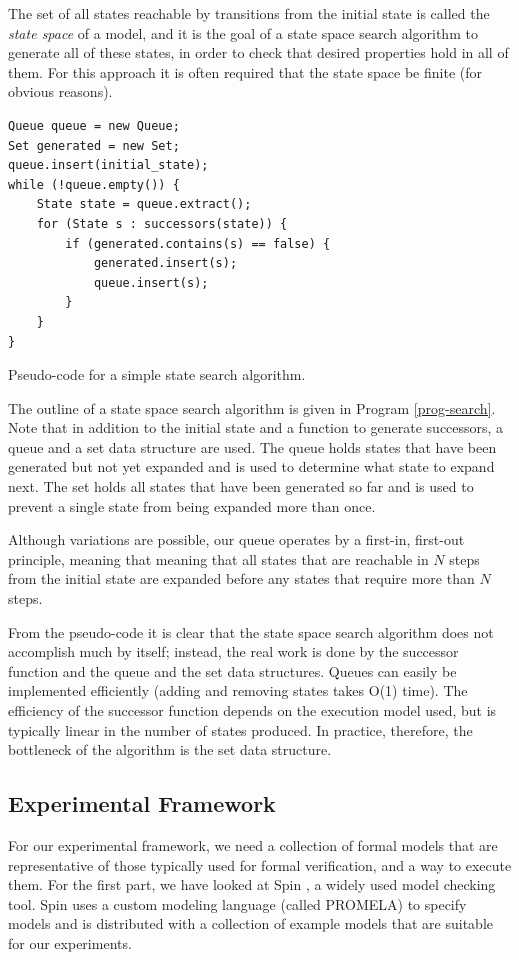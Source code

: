 \documentclass{acm_proc_article-sp}
\begin{document}
The set of all states reachable by transitions from the initial state is called
the \emph{state space} of a model, and it is the goal of a state space search
algorithm to generate all of these states, in order to check that desired
properties hold in all of them. For this approach it is often required that
the state space be finite (for obvious reasons).

\begin{program}
\begin{verbatim}
Queue queue = new Queue;
Set generated = new Set;
queue.insert(initial_state);
while (!queue.empty()) {
    State state = queue.extract();
    for (State s : successors(state)) {
        if (generated.contains(s) == false) {
            generated.insert(s);
            queue.insert(s);
        }
    }
}
\end{verbatim}
\caption{Pseudo-code for a simple state search algorithm.}
\label{prog-search}
\end{program}

The outline of a state space search algorithm is given in Program
\ref{prog-search}. Note that in addition to the initial state and a function
to generate successors, a queue and a set data structure are used. The queue
holds states that have been generated but not yet expanded and is used to
determine what state to expand next. The set holds all states that have been
generated so far and is used to prevent a single state from being expanded
more than once.

Although variations are possible, our queue operates by a first-in, first-out
principle, meaning that meaning that all states that are reachable in $N$ steps
from the initial state are expanded before any states that require more than
$N$ steps.

From the pseudo-code it is clear that the state space search algorithm does not
accomplish much by itself; instead, the real work is done by the successor
function and the queue and the set data structures. Queues can easily be
implemented efficiently (adding and removing states takes O(1) time).
The efficiency of the successor function depends on the execution model used,
but is typically linear in the number of states produced. In practice,
therefore, the bottleneck of the algorithm is the set data structure.

\subsection{Experimental Framework}
For our experimental framework, we need a collection of formal models that are
representative of those typically used for formal verification, and a way to
execute them. For the first part, we have looked at Spin \cite{holzmann2004smc},
a widely used model checking tool.
Spin uses a custom modeling language (called PROMELA) to specify models and is
distributed with a collection of example models that are suitable for our
experiments.
\end{document}
